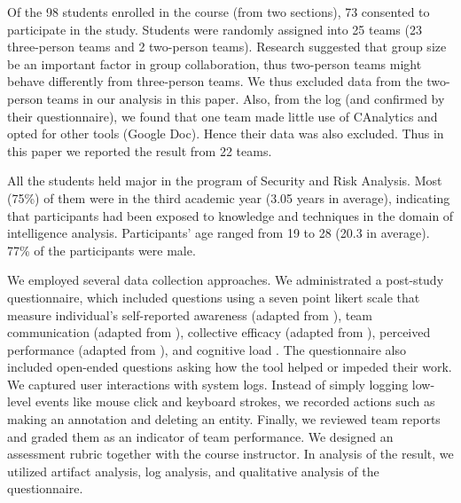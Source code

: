 Of the 98 students enrolled in the course (from two sections), 73
consented to participate in the study. Students were randomly assigned
into 25 teams (23 three-person teams and 2 two-person teams). Research
suggested that group size be an important factor in group collaboration,
thus two-person teams might behave differently from three-person teams.
We thus excluded data from the two-person teams in our analysis in this
paper. Also, from the log (and confirmed by their questionnaire), we
found that one team made little use of CAnalytics and opted for other
tools (Google Doc). Hence their data was also excluded. Thus in this
paper we reported the result from 22 teams.

All the students held major in the program of Security and Risk Analysis. Most
(75\%) of them were in the third academic year (3.05 years in average),
indicating that participants had been exposed to knowledge and techniques in the
domain of intelligence analysis. Participants' age ranged from 19 to 28 (20.3 in
average). 77\% of the participants were male.

We employed several data collection approaches. We administrated a
post-study questionnaire, which included questions using a seven point likert scale that measure individual's self-reported awareness (adapted from
\autocite{Convertino2011}), team communication (adapted from
\autocite{Convertino2011}), collective efficacy (adapted from
\autocite{Convertino2011}), perceived performance (adapted from
\autocite{Goyal2014}), and cognitive load \autocite{Hart1988}. The
questionnaire also included open-ended questions asking how the tool
helped or impeded their work. We captured user interactions with system
logs. Instead of simply logging low-level events like mouse click and
keyboard strokes, we recorded actions such as making an annotation and
deleting an entity. Finally, we reviewed team reports and graded them as
an indicator of team performance. We designed an assessment rubric
together with the course instructor. In analysis of the result, we
utilized artifact analysis, log analysis, and qualitative analysis of
the questionnaire.

